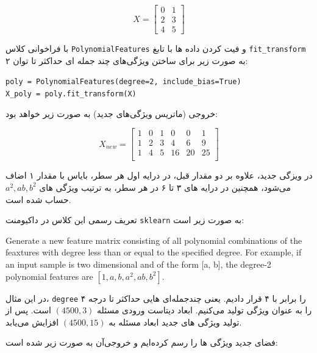 \begin{enumerate}
\begin{qsolve}
		$$
		X=\begin{bmatrix} 
			0 & 1 \\ 
			2 & 3 \\ 
			4 & 5 
		\end{bmatrix}
		$$
		
		با فراخوانی کلاس \texttt{PolynomialFeatures} و فیت کردن داده ها با تابغ \texttt{fit\_transform} به صورت زیر برای ساختن ویژگی‌های چند جمله ای حداکثر تا توان ۲:
		
		\begin{latin}
			\texttt{poly = PolynomialFeatures(degree=2, include\_bias=True)}\\
			\texttt{X\_poly = poly.fit\_transform(X)}
		\end{latin}
		
		خروجی (ماتریس ویژگی‌های جدید) به صورت زیر خواهد بود:
	\end{qsolve}
	
	
	
	
	
	\begin{qsolve}
		$$
		X_{new}=\begin{bmatrix} 
			1 & 0 & 1 & 0 & 0 & 1\\
			1 & 2 & 3 & 4 & 6 & 9\\ 
			1 & 4 & 5 & 16 & 20 & 25\\ 
		\end{bmatrix}
		$$
		
		در ويزگی جدید، علاوه بر دو مقدار قبل، در درایه اول هر سطر، بایاس با مقدار ۱ اضاف می‌شود، همچنین در درایه های ۳ تا ۶ در هر سطر، به ترتیب ویژگی های $a^2,ab,b^2$ حساب شده است.
		
		تعریف رسمی این کلاس در داکیومنت \texttt{sklearn} به صورت زیر است:
		
		\begin{latin}
			Generate a new feature matrix consisting of all polynomial combinations
			of the feaxtures with degree less than or equal to the specified degree.
			For example, if an input sample is two dimensional and of the form
			[a, b], the degree-2 polynomial features are $[1, a, b, a^2, ab, b^2]$.
		\end{latin}
		
		
		در این مثال، \texttt{degree} را برابر با ۴ قرار دادیم. یعنی چندجمله‌ای هایی حداکثر تا درجه ۴ را به عنوان ویژگی تولید می‌کنیم. ابعاد دیتاست ورودی مسئله $(4500, 3)$ است. پس از تولید ویژگی های جدید ابعاد مسئله به $(4500, 15)$ افزایش می‌یابد.
		
		فضای جدید ویژگی ها را رسم کرده‌ایم و خروجی‌آن به صورت زیر شده است:
		

\end{qsolve}
\end{enumerate}
